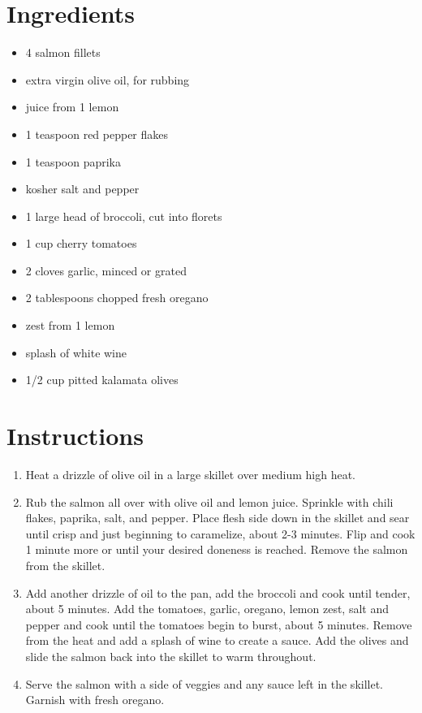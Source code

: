 \documentclass[
  letterpaper,
  DIV=11,
  numbers=noendperiod,
  titlepage=false]{scrreprt}
\providecommand{\tightlist}{%
  \setlength{\itemsep}{0pt}\setlength{\parskip}{0pt}}\usepackage{longtable,booktabs,array}
\begin{document}
\section{Ingredients}\label{ingredients-66}

\begin{itemize}
\tightlist
\item
  4 salmon fillets
\item
  extra virgin olive oil, for rubbing
\item
  juice from 1 lemon
\item
  1 teaspoon red pepper flakes
\item
  1 teaspoon paprika
\item
  kosher salt and pepper
\item
  1 large head of broccoli, cut into florets
\item
  1 cup cherry tomatoes
\item
  2 cloves garlic, minced or grated
\item
  2 tablespoons chopped fresh oregano
\item
  zest from 1 lemon
\item
  splash of white wine
\item
  1/2 cup pitted kalamata olives
\end{itemize}

\section{Instructions}\label{instructions-66}

\begin{enumerate}
\def\labelenumi{\arabic{enumi}.}
\tightlist
\item
  Heat a drizzle of olive oil in a large skillet over medium high heat.
\item
  Rub the salmon all over with olive oil and lemon juice. Sprinkle with
  chili flakes, paprika, salt, and pepper. Place flesh side down in the
  skillet and sear until crisp and just beginning to caramelize, about
  2-3 minutes. Flip and cook 1 minute more or until your desired
  doneness is reached. Remove the salmon from the skillet.
\item
  Add another drizzle of oil to the pan, add the broccoli and cook until
  tender, about 5 minutes. Add the tomatoes, garlic, oregano, lemon
  zest, salt and pepper and cook until the tomatoes begin to burst,
  about 5 minutes. Remove from the heat and add a splash of wine to
  create a sauce. Add the olives and slide the salmon back into the
  skillet to warm throughout.
\item
  Serve the salmon with a side of veggies and any sauce left in the
  skillet. Garnish with fresh oregano.
\end{enumerate}
\end{document}
